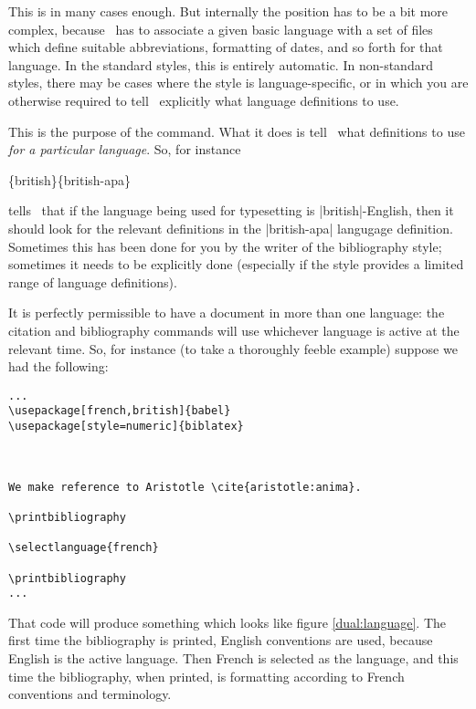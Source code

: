This is in many cases enough. But internally the position has to be a
bit more complex, because \biblatex\ has to associate a given basic
language with a set of files which define suitable abbreviations,
formatting of dates, and so forth for that language. In the standard
styles, this is entirely automatic. In non-standard styles, there may
be cases where the style is language-specific, or in which you are
otherwise required to tell \biblatex\ explicitly what language
definitions to use.

This is the purpose of the  command. What
it does is tell \biblatex\ what definitions to use \emph{for a
  particular language}. So, for instance
\begin{pseudoverb}
  \{british\}\{british-apa\}
\end{pseudoverb}
tells \biblatex\ that if the language being used for typesetting is
|british|-English, then it should look for the relevant definitions in
the |british-apa| langugage definition. Sometimes this has been done
for you by the writer of the bibliography style; sometimes it needs to
be explicitly done (especially if the style provides a limited range
of language definitions).

It is perfectly permissible to have a document in more than one
language: the citation and bibliography commands will use whichever
language is active at the relevant time. So, for instance (to take a
thoroughly feeble example) suppose we had the following:

\begin{Verbatim}[frame=single]
...
\usepackage[french,british]{babel}
\usepackage[style=numeric]{biblatex}



We make reference to Aristotle \cite{aristotle:anima}.

\printbibliography

\selectlanguage{french}

\printbibliography
...
\end{Verbatim}

\begin{figure*}
\vspace{3pt}%
\caption{A document using two languages\label{dual:language}}
\end{figure*}

That code will produce something which looks like figure
\ref{dual:language}. The first time the bibliography is printed,
English conventions are used, because English is the active
language. Then French is selected as the language, and this time the
bibliography, when printed, is formatting according to French
conventions and terminology.

